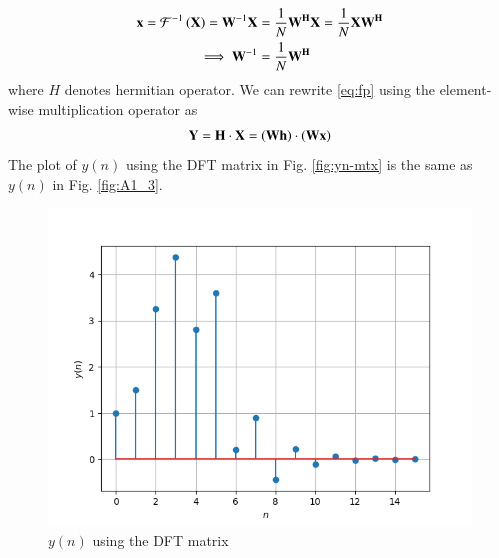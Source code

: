 \documentclass[journal,12pt,twocolumn]{IEEEtran}
\renewcommand\thesection{\arabic{section}}
\begin{document}
\begin{enumerate}[label=\thesection.\arabic*]
\begin{align}
	\mathbf{x} = \mathcal{F}^{-1}\left(\mathbf{X}\right) = \mathbf{W}^{-1}\mathbf{X} &= 
	\frac{1}{N}\mathbf{W^{H}}\mathbf{X} = \frac{1}{N}\mathbf{X}\mathbf{W^{H}} \\ 
	\implies \mathbf{W}^{-1} &= \frac{1}{N}\mathbf{W^{H}}
\end{align}
\noindent where $H$ denotes hermitian operator. We can rewrite \eqref{eq:fp} using the
element-wise multiplication operator as
\begin{align}
	\mathbf{Y} = \mathbf{H}\cdot\mathbf{X} = \left(\mathbf{W}\mathbf{h}\right)\cdot\left(\mathbf{W}\mathbf{x}\right)
\end{align}
The plot of $y(n)$ using the DFT matrix in Fig. \eqref{fig:yn-mtx} is the same as $y(n)$ in 
Fig. \eqref{fig:A1_3}. 

\begin{figure}[!htb]
	\centering
	\includegraphics[width=\columnwidth]{figures/Figure_6_5_yn_DFFT.png}
	\caption{$y(n)$ using the DFT matrix}
	\label{fig:yn-mtx}
\end{figure}
\end{enumerate}
%
\end{document}
